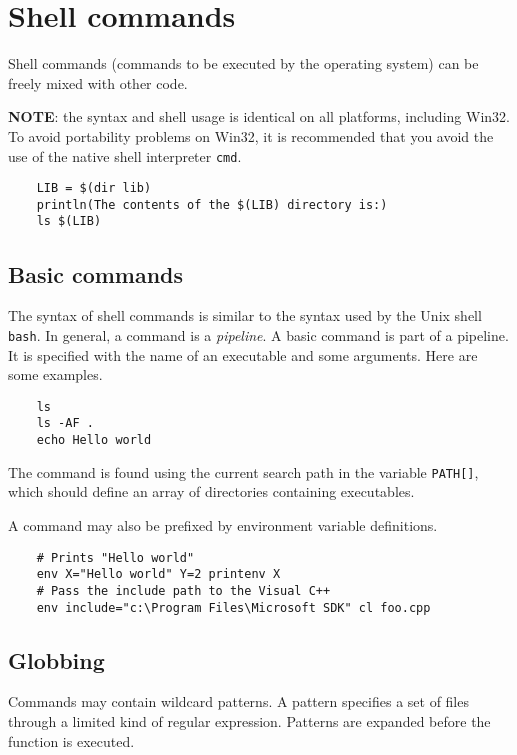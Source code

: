 %
\section{Shell commands}

Shell commands (commands to be executed by the operating system) can be freely mixed with other
code.

\textbf{NOTE}: the syntax and shell usage is identical on all platforms, including Win32.  To avoid
portability problems on Win32, it is recommended that you avoid the use of the native shell
interpreter \verb+cmd+.

\begin{verbatim}
    LIB = $(dir lib)
    println(The contents of the $(LIB) directory is:)
    ls $(LIB)
\end{verbatim}

\subsection{Basic commands}

The syntax of shell commands is similar to the syntax used by the Unix shell \verb+bash+.  In
general, a command is a \emph{pipeline}.  A basic command is part of a pipeline.  It is specified
with the name of an executable and some arguments.  Here are some examples.

\begin{verbatim}
    ls
    ls -AF .
    echo Hello world
\end{verbatim}

The command is found using the current search path in the variable \verb+PATH[]+, which should
define an array of directories containing executables.

A command may also be prefixed by environment variable definitions.

\begin{verbatim}
    # Prints "Hello world"
    env X="Hello world" Y=2 printenv X
    # Pass the include path to the Visual C++
    env include="c:\Program Files\Microsoft SDK" cl foo.cpp
\end{verbatim}

\subsection{Globbing}

Commands may contain wildcard patterns.  A pattern specifies a set of files through a limited kind
of regular expression.  Patterns are expanded before the function is executed.


